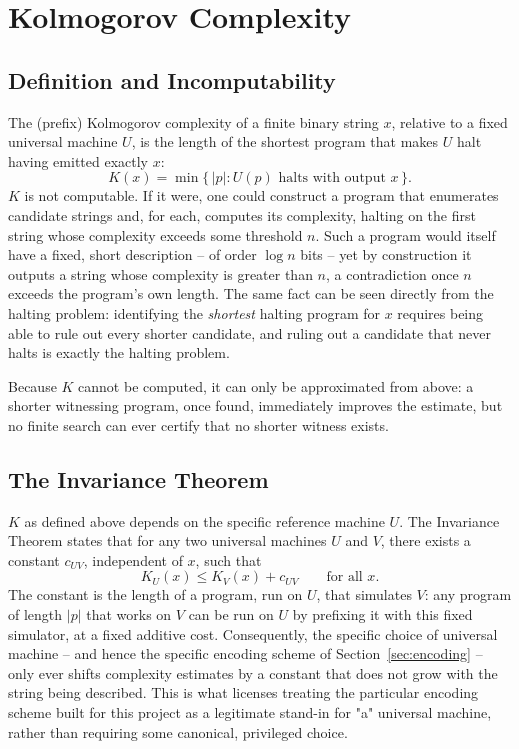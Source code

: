 \documentclass[11pt]{article}
\begin{document}
\section{Kolmogorov Complexity}
\label{sec:kolmogorov}

\subsection{Definition and Incomputability}

The (prefix) Kolmogorov complexity of a finite binary string $x$, relative to a fixed
universal machine $U$, is the length of the shortest program that makes $U$ halt having
emitted exactly $x$:
\[
  K(x) = \min\{\, |p| : U(p) \text{ halts with output } x \,\}.
\]
$K$ is not computable. If it were, one could construct a program that enumerates
candidate strings and, for each, computes its complexity, halting on the first string
whose complexity exceeds some threshold $n$. Such a program would itself have a fixed,
short description -- of order $\log n$ bits -- yet by construction it outputs a string
whose complexity is greater than $n$, a contradiction once $n$ exceeds the program's own
length. The same fact can be seen directly from the halting problem: identifying the
\emph{shortest} halting program for $x$ requires being able to rule out every shorter
candidate, and ruling out a candidate that never halts is exactly the halting problem.

Because $K$ cannot be computed, it can only be approximated from above: a shorter
witnessing program, once found, immediately improves the estimate, but no finite search
can ever certify that no shorter witness exists.

\subsection{The Invariance Theorem}
\label{sec:invariance}

$K$ as defined above depends on the specific reference machine $U$. The Invariance
Theorem states that for any two universal machines $U$ and $V$, there exists a constant
$c_{UV}$, independent of $x$, such that
\[
  K_U(x) \le K_V(x) + c_{UV} \qquad \text{for all } x.
\]
The constant is the length of a program, run on $U$, that simulates $V$: any program of
length $|p|$ that works on $V$ can be run on $U$ by prefixing it with this fixed
simulator, at a fixed additive cost. Consequently, the specific choice of universal
machine -- and hence the specific encoding scheme of Section~\ref{sec:encoding} -- only
ever shifts complexity estimates by a constant that does not grow with the string being
described. This is what licenses treating the particular encoding scheme built for this
project as a legitimate stand-in for "a" universal machine, rather than requiring some
canonical, privileged choice.
\end{document}
